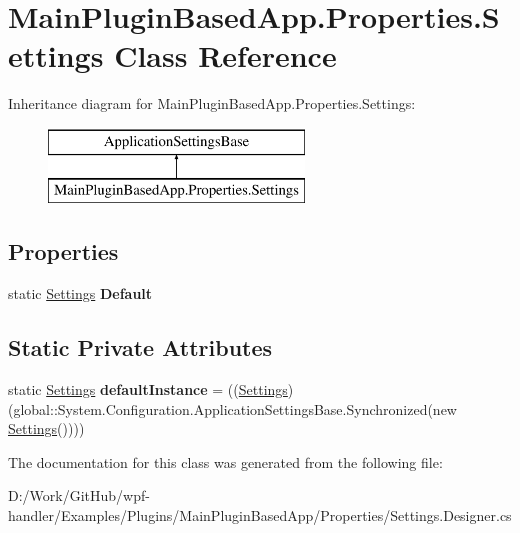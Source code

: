 \hypertarget{class_main_plugin_based_app_1_1_properties_1_1_settings}{}\section{Main\+Plugin\+Based\+App.\+Properties.\+Settings Class Reference}
\label{class_main_plugin_based_app_1_1_properties_1_1_settings}
Inheritance diagram for Main\+Plugin\+Based\+App.\+Properties.\+Settings\+:\begin{figure}[H]
\begin{center}
\leavevmode
\includegraphics[height=2.000000cm]{dc/dac/class_main_plugin_based_app_1_1_properties_1_1_settings}
\end{center}
\end{figure}
\subsection*{Properties}
\begin{DoxyCompactItemize}
\item 
\mbox{\label{class_main_plugin_based_app_1_1_properties_1_1_settings_a2bfea72222fc6610f3400c35b9644c9e}} 
static \mbox{\hyperlink{class_main_plugin_based_app_1_1_properties_1_1_settings}{Settings}} {\bfseries Default}
\end{DoxyCompactItemize}
\subsection*{Static Private Attributes}
\begin{DoxyCompactItemize}
\item 
\mbox{\label{class_main_plugin_based_app_1_1_properties_1_1_settings_a8901a6323db7b67b75f9a5f11a19b068}} 
static \mbox{\hyperlink{class_main_plugin_based_app_1_1_properties_1_1_settings}{Settings}} {\bfseries default\+Instance} = ((\mbox{\hyperlink{class_main_plugin_based_app_1_1_properties_1_1_settings}{Settings}})(global\+::\+System.\+Configuration.\+Application\+Settings\+Base.\+Synchronized(new \mbox{\hyperlink{class_main_plugin_based_app_1_1_properties_1_1_settings}{Settings}}())))
\end{DoxyCompactItemize}


The documentation for this class was generated from the following file\+:\begin{DoxyCompactItemize}
\item 
D\+:/\+Work/\+Git\+Hub/wpf-\/handler/\+Examples/\+Plugins/\+Main\+Plugin\+Based\+App/\+Properties/Settings.\+Designer.\+cs\end{DoxyCompactItemize}
